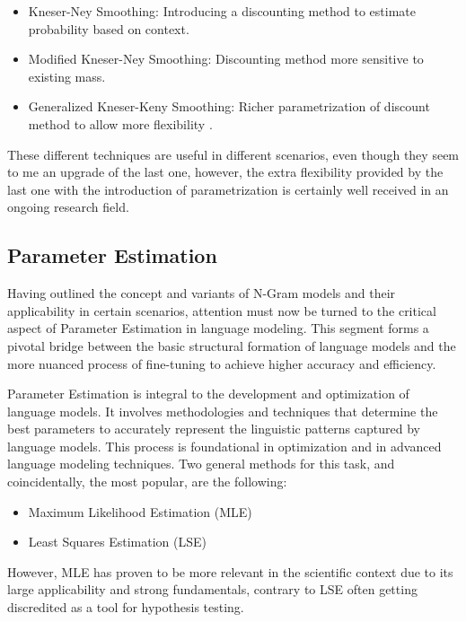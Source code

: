 \begin{itemize}
    \item Kneser-Ney Smoothing: Introducing a discounting method to estimate probability based on context.
    \item Modified Kneser-Ney Smoothing: Discounting method more sensitive to existing mass.
    \item Generalized Kneser-Keny Smoothing: Richer parametrization of discount method to allow more flexibility \cite{shareghi2019}.
\end{itemize}

These different techniques are useful in different scenarios, even though they seem to me an upgrade of the last one, however, the extra flexibility provided by the last one with the introduction of parametrization is certainly well received in an ongoing research field.

\subsection{Parameter Estimation}

Having outlined the concept and variants of N-Gram models and their applicability in certain scenarios, attention must now be turned to the critical aspect of Parameter Estimation in language modeling. This segment forms a pivotal bridge between the basic structural formation of language models and the more nuanced process of fine-tuning to achieve higher accuracy and efficiency.

Parameter Estimation is integral to the development and optimization of language models. It involves methodologies and techniques that determine the best parameters to accurately represent the linguistic patterns captured by language models. This process is foundational in optimization and in advanced language modeling techniques. Two general methods for this task, and coincidentally, the most popular, are the following:

\begin{itemize}
    \item Maximum Likelihood Estimation (MLE)
    \item Least Squares Estimation (LSE)
\end{itemize}

However, MLE has proven to be more relevant in the scientific context due to its large applicability and strong fundamentals, contrary to LSE often getting discredited as a tool for hypothesis testing.

